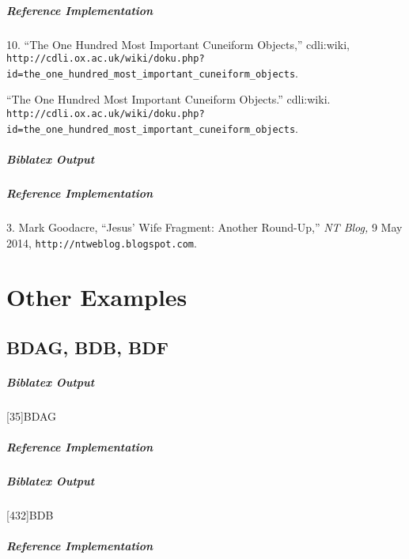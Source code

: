 \documentclass[a4paper]{article}
\newenvironment{biboutput}{%
  \subparagraph{Biblatex Output}
}{\color{black}}
\newenvironment{refimp}{%
  \subparagraph{Reference Implementation}
  \color{reference-colour}
  \rm
}{\par\color{black}}
\begin{document}
\begin{refimp}
  \hspace*{\bibindent}10. “The One Hundred Most Important Cuneiform Objects,”
  cdli:wiki,
  \nolinkurl{http://cdli.ox.ac.uk/wiki/doku.php?id=the_one_hundred_most_important_cuneiform_objects}.

  \hangindent\bibindent “The One Hundred Most Important Cuneiform Objects.”
  cdli:wiki.
  \nolinkurl{http://cdli.ox.ac.uk/wiki/doku.php?id=the_one_hundred_most_important_cuneiform_objects}.
\end{refimp}

\begin{biboutput}
\end{biboutput}

\begin{refimp}
  \hspace*{\bibindent}3. Mark Goodacre, “Jesus’ Wife Fragment: Another
  Round-Up,” \emph{NT Blog,} 9 May 2014,
  \nolinkurl{http://ntweblog.blogspot.com}.
\end{refimp}

\section{Other Examples}

\subsection{BDAG, BDB, BDF}

\begin{biboutput}
  [35]{BDAG}
\end{biboutput}

\begin{refimp}
\end{refimp}

\begin{biboutput}
  [432]{BDB}
\end{biboutput}

\begin{refimp}
\end{refimp}
\end{document}
